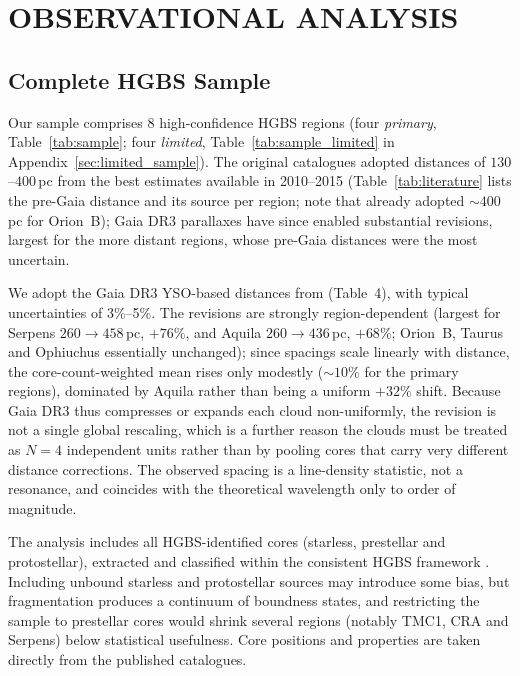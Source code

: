 \documentclass[usenatbib,twoside,twocolumn]{mnras}
\begin{document}
\section{OBSERVATIONAL ANALYSIS}

\subsection{Complete HGBS Sample}

Our sample comprises 8 high-confidence HGBS regions (four \emph{primary}, Table~\ref{tab:sample}; four \emph{limited}, Table~\ref{tab:sample_limited} in Appendix~\ref{sec:limited_sample}). The original catalogues \citep{Konyves2015, Konyves2020, Ladjelate2020, Pezzuto2021} adopted distances of $130$--$400$\,pc from the best estimates available in 2010--2015 (Table~\ref{tab:literature} lists the pre-Gaia distance and its source per region; note that \citealt{Konyves2020} already adopted $\sim400$\,pc for Orion~B); Gaia DR3 parallaxes \citep{Zhang2023} have since enabled substantial revisions, largest for the more distant regions, whose pre-Gaia distances were the most uncertain.

We adopt the Gaia DR3 YSO-based distances from \citet{Zhang2023} (Table~4), with typical uncertainties of 3\%--5\%. The revisions are strongly region-dependent (largest for Serpens $260\to458$\,pc, $+76\%$, and Aquila $260\to436$\,pc, $+68\%$; Orion~B, Taurus and Ophiuchus essentially unchanged); since spacings scale linearly with distance, the core-count-weighted mean rises only modestly ($\sim10\%$ for the primary regions), dominated by Aquila rather than being a uniform $+32\%$ shift. Because Gaia DR3 thus compresses or expands each cloud non-uniformly, the revision is not a single global rescaling, which is a further reason the clouds must be treated as $N=4$ independent units rather than by pooling cores that carry very different distance corrections. The observed spacing is a line-density statistic, not a resonance, and coincides with the theoretical wavelength only to order of magnitude.

The analysis includes all HGBS-identified cores (starless, prestellar and protostellar), extracted and classified within the consistent HGBS framework \citep{Konyves2015, Konyves2020}. Including unbound starless and protostellar sources may introduce some bias, but fragmentation produces a continuum of boundness states, and restricting the sample to prestellar cores would shrink several regions (notably TMC1, CRA and Serpens) below statistical usefulness. Core positions and properties are taken directly from the published catalogues.
\end{document}
